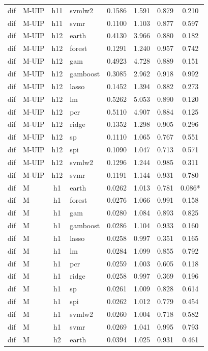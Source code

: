 \begin{ThreePartTable}
\begin{longtable}[t]{llclcccc}
dif & M-UIP & h11 & svmlw2 & 0.1586 & 1.591 & 0.879 & 0.210\\
dif & M-UIP & h11 & svmr & 0.1100 & 1.103 & 0.877 & 0.597\\
\addlinespace
dif & M-UIP & h12 & earth & 0.4130 & 3.966 & 0.880 & 0.182\\
dif & M-UIP & h12 & forest & 0.1291 & 1.240 & 0.957 & 0.742\\
dif & M-UIP & h12 & gam & 0.4923 & 4.728 & 0.889 & 0.151\\
dif & M-UIP & h12 & gamboost & 0.3085 & 2.962 & 0.918 & 0.992\\
dif & M-UIP & h12 & lasso & 0.1452 & 1.394 & 0.882 & 0.273\\
dif & M-UIP & h12 & lm & 0.5262 & 5.053 & 0.890 & 0.120\\
dif & M-UIP & h12 & pcr & 0.5110 & 4.907 & 0.884 & 0.125\\
dif & M-UIP & h12 & ridge & 0.1352 & 1.298 & 0.905 & 0.296\\
dif & M-UIP & h12 & sp & 0.1110 & 1.065 & 0.767 & 0.551\\
dif & M-UIP & h12 & spi & 0.1090 & 1.047 & 0.713 & 0.571\\
dif & M-UIP & h12 & svmlw2 & 0.1296 & 1.244 & 0.985 & 0.311\\
dif & M-UIP & h12 & svmr & 0.1191 & 1.144 & 0.931 & 0.780\\
\addlinespace
dif & M & h1 & earth & 0.0262 & 1.013 & 0.781 & 0.086*\\
dif & M & h1 & forest & 0.0276 & 1.066 & 0.991 & 0.158\\
dif & M & h1 & gam & 0.0280 & 1.084 & 0.893 & 0.825\\
dif & M & h1 & gamboost & 0.0286 & 1.104 & 0.933 & 0.160\\
dif & M & h1 & lasso & 0.0258 & 0.997 & 0.351 & 0.165\\
dif & M & h1 & lm & 0.0284 & 1.099 & 0.855 & 0.792\\
dif & M & h1 & pcr & 0.0259 & 1.003 & 0.605 & 0.118\\
dif & M & h1 & ridge & 0.0258 & 0.997 & 0.369 & 0.196\\
dif & M & h1 & sp & 0.0261 & 1.009 & 0.828 & 0.614\\
dif & M & h1 & spi & 0.0262 & 1.012 & 0.779 & 0.454\\
dif & M & h1 & svmlw2 & 0.0260 & 1.004 & 0.718 & 0.582\\
dif & M & h1 & svmr & 0.0269 & 1.041 & 0.995 & 0.793\\
\addlinespace
dif & M & h2 & earth & 0.0394 & 1.025 & 0.931 & 0.461\\

\end{longtable}
\end{ThreePartTable}
